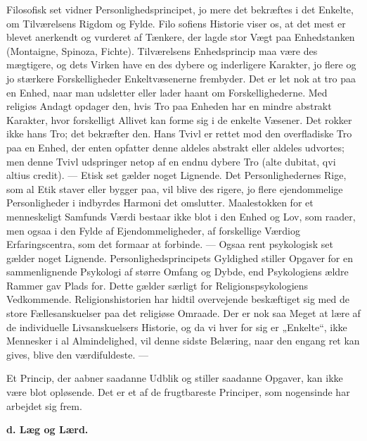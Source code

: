 \documentclass[12pt,a4paper,openany]{book}
\newcommand{\opage}[1]{\marginnote{\footnotesize\textit{[#1]}}}
\begin{document}
Filosofisk set vidner Personlighedsprincipet, jo mere det bekræftes i
det Enkelte, om Tilværelsens Rigdom og Fylde. Filo%
\opage{204}sofiens Historie viser os, at det mest er blevet anerkendt og
vurderet af Tænkere, der lagde stor Vægt paa Enhedstanken (Montaigne,
Spinoza, Fichte). Tilværelsens Enhedsprincip maa være des mægtigere, og
dets Virken have en des dybere og inderligere Karakter, jo flere og jo
stærkere Forskelligheder Enkeltvæsenerne frembyder. Det er let nok at
tro paa en Enhed, naar man udsletter eller lader haant om
Forskellighederne. Med religiøs Andagt opdager den, hvis Tro paa Enheden
har en mindre abstrakt Karakter, hvor forskelligt Allivet kan forme sig
i de enkelte Væsener. Det rokker ikke hans Tro; det bekræfter den. Hans
Tvivl er rettet mod den overfladiske Tro paa en Enhed, der enten
opfatter denne aldeles abstrakt eller aldeles udvortes; men denne Tvivl
udspringer netop af en endnu dybere Tro (alte dubitat, qvi altius
credit). --- Etisk set gælder noget Lignende. Det Personlighedernes
Rige, som al Etik staver eller bygger paa, vil blive des rigere, jo
flere ejendommelige Personligheder i indbyrdes Harmoni det omslutter.
Maalestokken for et menneskeligt Samfunds Værdi bestaar ikke blot i den
Enhed og Lov, som raader, men ogsaa i den Fylde af Ejendommeligheder, af
forskellige Værdiog Erfaringscentra, som det formaar at forbinde. ---
Ogsaa rent psykologisk set gælder noget Lignende.
Personlighedsprincipets Gyldighed stiller Opgaver for en sammenlignende
Psykologi af større Omfang og Dybde, end Psykologiens ældre Rammer gav
Plads for. Dette gælder særligt for Religionspsykologiens Vedkommende.
Religionshistorien har hidtil overvejende beskæftiget sig med de store
Fællesanskuelser paa det religiøse Omraade. Der er nok saa Meget at lære
af de individuelle Livsanskuelsers Historie, og da vi hver for sig er
„Enkelte“, ikke Mennesker i al Almindelighed, vil denne sidste Belæring,
naar den engang ret kan gives, blive den værdifuldeste. ---

Et Princip, der aabner saadanne Udblik og stiller saadanne Opgaver, kan
ikke være blot opløsende. Det er et af de frugtbareste Principer, som
nogensinde har arbejdet sig frem.

\begin{center}\textbf{d. Læg og Lærd.}\end{center}
\end{document}

